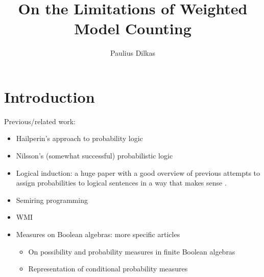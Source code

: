 \documentclass{article}
\title{On the Limitations of Weighted Model Counting}
\author{Paulius Dilkas}
\theoremstyle{definition}
\theoremstyle{remark}
\begin{document}
\maketitle

\section{Introduction}


Previous/related work:
\begin{itemize}
\item Hailperin's approach to probability logic
  \cite{DBLP:journals/ndjfl/Hailperin84}
\item Nilsson's (somewhat successful) probabilistic logic
  \cite{DBLP:journals/ai/Nilsson86}
\item Logical induction: a huge paper with a good overview of previous attempts
  to assign probabilities to logical sentences in a way that makes sense
  \cite{DBLP:journals/eccc/GarrabrantBCST16}.
\item Semiring programming \cite{DBLP:journals/corr/BelleR16}
\item WMI \cite{DBLP:conf/ijcai/BellePB15}
\item Measures on Boolean algebras: more specific articles
  \begin{itemize}
  \item On possibility and probability measures in finite Boolean algebras
    \cite{DBLP:journals/soco/CastineiraCT02}
  \item Representation of conditional probability measures
    \cite{krauss1968representation}
  \end{itemize}
\end{itemize}
\end{document}
